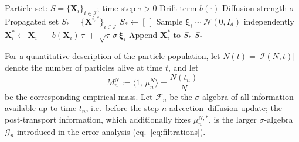 \documentclass[a4paper,fleqn]{cas-sc}
\theoremstyle{definition}
\theoremstyle{remark}
\begin{document}
\begin{algorithm}
\caption{SDE propagation of the advection--diffusion step}\label{alg:sde}
\begin{algorithmic}
\Require Particle set: $S=\{\mathbf{X}_i\}_{i\in\mathcal I}$; time step $\tau>0$
\Require Drift term $b(\cdot)$
\Require Diffusion strength $\sigma$
\Ensure Propagated set $S_*=\{\mathbf{X}^{i,*}\}_{i\in\mathcal I}$
  \State $S_{*}\gets [\ ]$
    \State Sample $\boldsymbol{\xi}_i \sim \mathcal N(0,I_d)$ independently
    \State $\mathbf{X}^*_i \gets \mathbf{X}_i \;+\; b(\mathbf{X}_i)\,\tau \;+\; \sqrt{\tau}\,\sigma\,\boldsymbol{\xi}_i$
    \State Append $\mathbf{X}^{*}_i$ to $S_{*}$
  \EndFor
  \State \Return $S_{*}$
\EndProcedure
\end{algorithmic}
\end{algorithm}

For a quantitative description of the particle population, let
$N(t)=\lvert\mathcal I(N,t)\rvert$ denote the number of particles alive at
time $t$, and let
\[
   M^N_n := \big\langle 1,\,\mu^N_n\big\rangle
   =\frac{N(t_n)}{N}
\]
be the corresponding empirical mass. Let $\mathcal F_n$ be the
$\sigma$-algebra of all information available up to time $t_n$, i.e.\ before the
step-$n$ advection--diffusion update; the post-transport information, which
additionally fixes $\mu^{N,*}_n$, is the larger $\sigma$-algebra $\mathcal G_n$
introduced in the error analysis (eq.~\eqref{eq:filtrations}).
\end{document}
